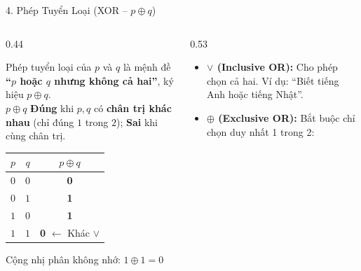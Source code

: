 \documentclass[aspectratio=169, 10pt]{beamer}
\begin{document}
\begin{frame}{4. Phép Tuyển Loại (XOR -- $p \oplus q$)}
  \begin{columns}[t, onlytextwidth]
    \begin{column}{0.44\textwidth}
      \begin{cozyDef}
        \small
        Phép tuyển loại của $p$ và $q$ là mệnh đề \textbf{``$p$ hoặc $q$ nhưng không cả hai''}, ký hiệu $p \oplus q$.\\
        \vspace{0.05cm}
        $p \oplus q$ \textbf{\textcolor{cozyTrue}{Đúng}} khi $p, q$ có \textbf{chân trị khác nhau} (chỉ đúng $1$ trong $2$); \textbf{\textcolor{cozyFalse}{Sai}} khi cùng chân trị.
        \vspace{0.15cm}
        \begin{center}
          \renewcommand{\arraystretch}{1.1}
          \begin{tabular}{cc|c}
            \toprule
            $p$ & $q$ & $p \oplus q$ \\
            \midrule
            $0$ & $0$ & \textbf{\textcolor{cozyFalse}{0}} \\
            $0$ & $1$ & \textbf{\textcolor{cozyTrue}{1}} \\
            $1$ & $0$ & \textbf{\textcolor{cozyTrue}{1}} \\
            $1$ & $1$ & \textbf{\textcolor{cozyFalse}{0}} \;\textcolor{cozyWarm}{$\leftarrow$ Khác $\lor$} \\
            \bottomrule
          \end{tabular}
        \end{center}
        \vspace{0.05cm}
        \par\footnotesize\centering\color{cozyMuted}Cộng nhị phân không nhớ: $1 \oplus 1 = 0$
      \end{cozyDef}
    \end{column}
    \begin{column}{0.53\textwidth}
      \begin{cozyTrap}
        \small
        \begin{itemize}
          \setlength{\itemsep}{3pt}
          \item \textbf{$\lor$ (Inclusive OR):} Cho phép chọn cả hai. Ví dụ: ``Biết tiếng Anh hoặc tiếng Nhật''.
          \item \textbf{$\oplus$ (Exclusive OR):} Bắt buộc chỉ chọn duy nhất 1 trong 2:

\end{itemize}
\end{cozyTrap}
\end{column}
\end{columns}
\end{frame}
\end{document}
